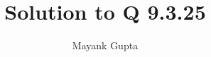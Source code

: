 \documentclass[journal,12pt,onecolumn]{IEEEtran}
\theoremstyle{remark}
\begin{document}
%




\vspace{3cm}

\title{
	Solution to Q 9.3.25
}
\author{ Mayank Gupta %
}


%
%
%

% 
%



% 
\end{document}

